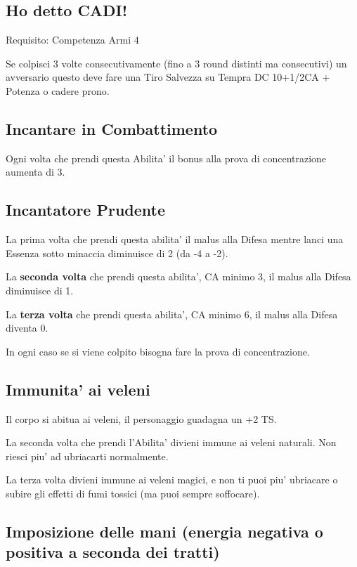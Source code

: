 \documentclass[a4paper,11pt,twoside,openany]{book}
\begin{document}
\subsection{Ho detto CADI!}

Requisito: Competenza Armi 4

Se colpisci 3 volte consecutivamente (fino a 3 round distinti ma consecutivi) un avversario questo deve fare una Tiro Salvezza su Tempra DC 10+1/2CA + Potenza o cadere prono.

\subsection{Incantare in Combattimento}

Ogni volta che prendi questa Abilita' il bonus alla prova di concentrazione aumenta di 3.

\subsection{Incantatore Prudente}

La prima volta che prendi questa abilita' il malus alla Difesa mentre lanci una Essenza sotto minaccia diminuisce di 2 (da -4 a -2).

La \textbf{seconda volta} che prendi questa abilita', CA minimo 3, il malus alla Difesa diminuisce di 1.

La \textbf{terza volta} che prendi questa abilita', CA minimo 6, il malus alla Difesa diventa 0.

In ogni caso se si viene colpito bisogna fare la prova di concentrazione.

\subsection{Immunita' ai veleni}

Il corpo si abitua ai veleni, il personaggio guadagna un +2 TS.

La seconda volta che prendi l'Abilita' divieni immune ai veleni naturali.
Non riesci piu' ad ubriacarti normalmente.

La terza volta divieni immune ai veleni magici, e non ti puoi piu' ubriacare o subire gli effetti di fumi tossici (ma puoi sempre soffocare).

\subsection{Imposizione delle mani (energia negativa o positiva a seconda dei tratti)}
\end{document}
